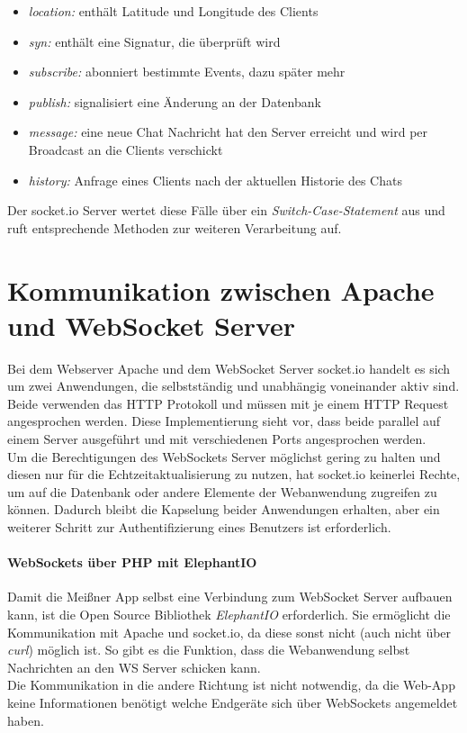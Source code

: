 \begin{itemize}
	\item[] \emph{location:} enthält Latitude und Longitude des Clients
	\item[] \emph{syn:} enthält eine Signatur, die überprüft wird
	\item[] \emph{subscribe:} abonniert bestimmte Events, dazu später mehr
	\item[] \emph{publish:} signalisiert eine Änderung an der Datenbank
	\item[] \emph{message:} eine neue Chat Nachricht hat den Server erreicht und wird per Broadcast an die Clients verschickt
	\item[] \emph{history:} Anfrage eines Clients nach der aktuellen Historie des Chats
\end{itemize}

Der socket.io Server wertet diese Fälle über ein \emph{Switch-Case-Statement} aus und ruft entsprechende Methoden zur weiteren Verarbeitung auf.

\section{Kommunikation zwischen Apache und WebSocket Server}
Bei dem Webserver Apache und dem WebSocket Server socket.io handelt es sich um zwei Anwendungen, die selbstständig und unabhängig voneinander aktiv sind. Beide verwenden das HTTP Protokoll und müssen mit je einem HTTP Request angesprochen werden. Diese Implementierung sieht vor, dass beide parallel auf einem Server ausgeführt und mit verschiedenen Ports angesprochen werden.\\
Um die Berechtigungen des WebSockets Server möglichst gering zu halten und diesen nur für die Echtzeitaktualisierung zu nutzen, hat socket.io keinerlei Rechte, um auf die Datenbank oder andere Elemente der Webanwendung zugreifen zu können. Dadurch bleibt die Kapselung beider Anwendungen erhalten, aber ein weiterer Schritt zur Authentifizierung eines Benutzers ist erforderlich.

\paragraph{WebSockets über PHP mit ElephantIO}
Damit die Meißner App selbst eine Verbindung zum WebSocket Server aufbauen kann, ist die Open Source Bibliothek \emph{ElephantIO} \cite{elephant.io} erforderlich. Sie ermöglicht die Kommunikation mit Apache und socket.io, da diese sonst nicht (auch nicht über \emph{curl}) möglich ist. So gibt es die Funktion, dass die Webanwendung selbst Nachrichten an den WS Server schicken kann.\\
Die Kommunikation in die andere Richtung ist nicht notwendig, da die Web-App keine Informationen benötigt welche Endgeräte sich über WebSockets angemeldet haben.

